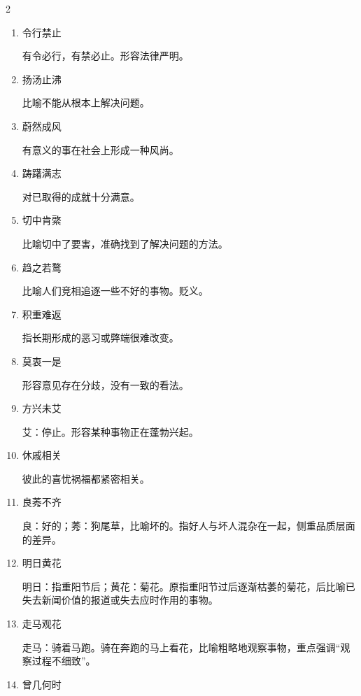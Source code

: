 \documentclass[final,oneside]{ctexbook}
\begin{document}
\begin{multicols}{2}
\begin{enumerate}
    \item 令行禁止

      有令必行，有禁必止。形容法律严明。

    \item 扬汤止沸

      比喻不能从根本上解决问题。

    \item 蔚然成风

      有意义的事在社会上形成一种风尚。

    \item 踌躇满志

      对已取得的成就十分满意。

    \item 切中肯綮

      比喻切中了要害，准确找到了解决问题的方法。

    \item 趋之若鹜

      比喻人们竞相追逐一些不好的事物。贬义。

    \item 积重难返

      指长期形成的恶习或弊端很难改变。

    \item 莫衷一是

      形容意见存在分歧，没有一致的看法。

    \item 方兴未艾

      艾：停止。形容某种事物正在蓬勃兴起。

    \item 休戚相关

      彼此的喜忧祸福都紧密相关。

    \item 良莠不齐

      良：好的；莠：狗尾草，比喻坏的。指好人与坏人混杂在一起，侧重品质层面的差异。

    \item 明日黄花

      明日：指重阳节后；黄花：菊花。原指重阳节过后逐渐枯萎的菊花，后比喻已失去新闻价值的报道或失去应时作用的事物。

    \item 走马观花

      走马：骑着马跑。骑在奔跑的马上看花，比喻粗略地观察事物，重点强调“观察过程不细致”。

    \item 曾几何时


\end{enumerate}
\end{multicols}
\end{document}
